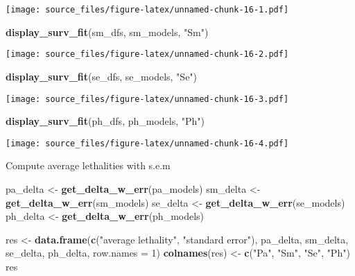 \documentclass[]{article}
\newenvironment{Shaded}{\begin{snugshade}}{\end{snugshade}}
\newcommand{\KeywordTok}[1]{\textcolor[rgb]{0.13,0.29,0.53}{\textbf{#1}}}
\newcommand{\DataTypeTok}[1]{\textcolor[rgb]{0.13,0.29,0.53}{#1}}
\newcommand{\DecValTok}[1]{\textcolor[rgb]{0.00,0.00,0.81}{#1}}
\newcommand{\StringTok}[1]{\textcolor[rgb]{0.31,0.60,0.02}{#1}}
\newcommand{\NormalTok}[1]{#1}
\begin{document}
\texttt{[image: source\_files/figure-latex/unnamed-chunk-16-1.pdf]}

\begin{Shaded}
\begin{Highlighting}[]
\KeywordTok{display_surv_fit}\NormalTok{(sm_dfs, sm_models, }\StringTok{"Sm"}\NormalTok{)}
\end{Highlighting}
\end{Shaded}

\texttt{[image: source\_files/figure-latex/unnamed-chunk-16-2.pdf]}

\begin{Shaded}
\begin{Highlighting}[]
\KeywordTok{display_surv_fit}\NormalTok{(se_dfs, se_models, }\StringTok{"Se"}\NormalTok{)}
\end{Highlighting}
\end{Shaded}

\texttt{[image: source\_files/figure-latex/unnamed-chunk-16-3.pdf]}

\begin{Shaded}
\begin{Highlighting}[]
\KeywordTok{display_surv_fit}\NormalTok{(ph_dfs, ph_models, }\StringTok{"Ph"}\NormalTok{)}
\end{Highlighting}
\end{Shaded}

\texttt{[image: source\_files/figure-latex/unnamed-chunk-16-4.pdf]}

Compute average lethalities with s.e.m

\begin{Shaded}
\begin{Highlighting}[]
\NormalTok{pa_delta  <-}\StringTok{ }\KeywordTok{get_delta_w_err}\NormalTok{(pa_models)}
\NormalTok{sm_delta  <-}\StringTok{ }\KeywordTok{get_delta_w_err}\NormalTok{(sm_models)}
\NormalTok{se_delta  <-}\StringTok{ }\KeywordTok{get_delta_w_err}\NormalTok{(se_models)}
\NormalTok{ph_delta  <-}\StringTok{ }\KeywordTok{get_delta_w_err}\NormalTok{(ph_models)}

\NormalTok{res <-}\StringTok{ }\KeywordTok{data.frame}\NormalTok{(}\KeywordTok{c}\NormalTok{(}\StringTok{"average lethality"}\NormalTok{, }\StringTok{"standard error"}\NormalTok{), pa_delta, sm_delta, se_delta, ph_delta, }\DataTypeTok{row.names =} \DecValTok{1}\NormalTok{)}
\KeywordTok{colnames}\NormalTok{(res) <-}\StringTok{ }\KeywordTok{c}\NormalTok{(}\StringTok{"Pa"}\NormalTok{, }\StringTok{"Sm"}\NormalTok{, }\StringTok{"Se"}\NormalTok{, }\StringTok{"Ph"}\NormalTok{)}
\NormalTok{res}
\end{Highlighting}
\end{Shaded}
\end{document}
